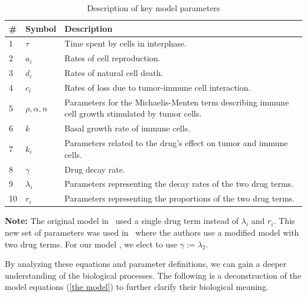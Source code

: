 \begin{table}[ht]
\centering
\begin{tabularx}{\textwidth}{@{} l l X @{}}
\toprule
\textbf{\#} & \textbf{Symbol} & \textbf{Description} \\ \midrule
1 & $\tau$ & Time spent by cells in interphase. \\
2 & $a_i$ & Rates of cell reproduction. \\
3 & $d_i$ & Rates of natural cell death. \\
4 & $c_i$ & Rates of loss due to tumor-immune cell interaction. \\
5 & $\rho, \alpha, n$ & Parameters for the \gls{Michaelis-Menten term} describing immune cell growth stimulated by tumor cells. \\
6 & $k$ & Basal growth rate of immune cells. \\
7 & $k_i$ & Parameters related to the drug's effect on tumor and immune cells. \\
8 & $\gamma$ & Drug decay rate. \\
9 & $\lambda_i$ & Parameters representing the decay rates of the two drug terms. \\
10 & $r_i$ & Parameters representing the proportions of the two drug terms. \\ \bottomrule
\end{tabularx}
\caption{Description of key model parameters}
\label{table:parameter descriptions}
\end{table}

\textbf{Note:} The original model in~\cite{villasana2003} used a single drug term instead of $\lambda_i$ and $r_i$. This new set of parameters was used in~\cite{villasana2004} where the authors use a modified model with two drug terms. For our model \cite{villasana2003}, we elect to use $ \gamma := \lambda_2$.

By analyzing these equations and parameter definitions, we can gain a deeper understanding of the biological processes. The following is a deconstruction of the model equations (\ref{the model}) to further clarify their biological meaning.

